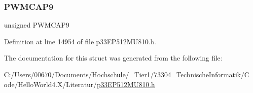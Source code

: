 \mbox{\label{structtag_p_w_m_c_a_p4_b_i_t_s_a9a0cd5d7a58681927adecfd9946b75fb}} 
\subsubsection{\texorpdfstring{P\+W\+M\+C\+A\+P9}{PWMCAP9}}
{\footnotesize\ttfamily unsigned P\+W\+M\+C\+A\+P9}



Definition at line 14954 of file p33\+E\+P512\+M\+U810.\+h.



The documentation for this struct was generated from the following file\+:\begin{DoxyCompactItemize}
\item 
C\+:/\+Users/00670/\+Documents/\+Hochschule/\+\_\+\+Tier1/73304\+\_\+\+Technische\+Informatik/\+Code/\+Hello\+World4.\+X/\+Literatur/\hyperlink{p33_e_p512_m_u810_8h}{p33\+E\+P512\+M\+U810.\+h}\end{DoxyCompactItemize}
